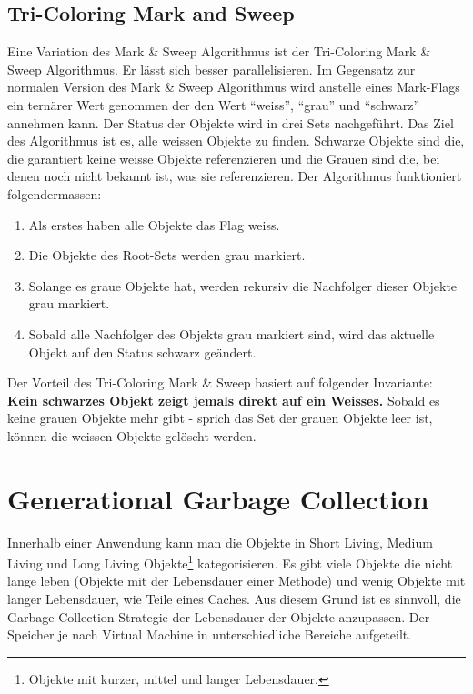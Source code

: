 \subsection{Tri-Coloring Mark and Sweep}\label{tri-coloring mark and sweep}
Eine Variation des Mark \& Sweep Algorithmus ist der Tri-Coloring Mark \& Sweep Algorithmus. Er lässt sich besser parallelisieren\cite[S. 79]{lagergren2010oracle}. Im Gegensatz zur normalen Version des Mark \& Sweep Algorithmus wird anstelle eines Mark-Flags ein ternärer Wert genommen der den Wert ``weiss'', ``grau'' und ``schwarz'' annehmen kann. Der Status der Objekte wird in drei Sets nachgeführt. Das Ziel des Algorithmus ist es, alle weissen Objekte zu finden. Schwarze Objekte sind die, die garantiert keine weisse Objekte referenzieren und die Grauen sind die, bei denen noch nicht bekannt ist, was sie referenzieren. Der Algorithmus funktioniert folgendermassen:

\begin{enumerate}
	\item Als erstes haben alle Objekte das Flag weiss.
	\item Die Objekte des Root-Sets werden grau markiert.
	\item Solange es graue Objekte hat, werden rekursiv die Nachfolger dieser Objekte grau markiert.
	\item Sobald alle Nachfolger des Objekts grau markiert sind, wird das aktuelle Objekt auf den Status schwarz geändert.
\end{enumerate}

Der Vorteil des Tri-Coloring Mark \& Sweep basiert auf folgender Invariante:
\textbf{Kein schwarzes Objekt zeigt jemals direkt auf ein Weisses.}
Sobald es keine grauen Objekte mehr gibt - sprich das Set der grauen Objekte leer ist, können die weissen Objekte gelöscht werden.

\section{Generational Garbage Collection}\label{generational gc}
Innerhalb einer Anwendung kann man die Objekte in Short Living, Medium Living und Long Living Objekte\footnote{Objekte mit kurzer, mittel und langer Lebensdauer.} kategorisieren. Es gibt viele Objekte die nicht lange leben (Objekte mit der Lebensdauer einer Methode) und wenig Objekte mit langer Lebensdauer, wie Teile eines Caches. Aus diesem Grund ist es sinnvoll, die Garbage Collection Strategie der Lebensdauer der Objekte anzupassen. Der Speicher je nach Virtual Machine in unterschiedliche Bereiche aufgeteilt.

